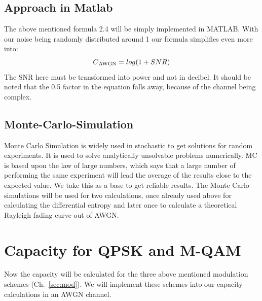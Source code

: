 \documentclass[12pt,oneside, draft]{report}
\begin{document}
\subsection{Approach in Matlab}
The above mentioned formula 2.4 will be simply implemented in MATLAB. With our noise being randomly distributed around 1 our formula simplifies even more into:
\begin{equation}
\label{eq:AWGN}
C\textsubscript{AWGN} = log(1+SNR) 
\end{equation} 
The SNR here must be transformed into power and not in decibel. It should be noted that the 0.5 factor in the equation falls away, because of the channel being complex.

\subsection{Monte-Carlo-Simulation}
\label{sec:MCS}
Monte Carlo Simulation is widely used in stochastic to get solutions for random experiments. It is used to solve analytically unsolvable problems numerically. MC is based upon the law of large numbers, which says that a large number of performing the same experiment will lead the average of the results close to the expected value. We take this as a base to get reliable results. The Monte Carlo simulations will be used for two calculations, once already used above for calculating the differential entropy and later once to calculate a theoretical Rayleigh fading curve out of AWGN. 

\section{Capacity for QPSK and M-QAM}
Now the capacity will be calculated for the three above mentioned modulation schemes (Ch.~\autoref{sec:mod}). We will implement these schemes into our capacity calculations in an AWGN channel.
\end{document}
